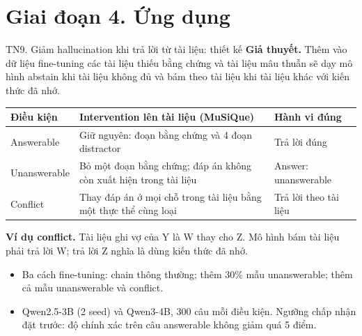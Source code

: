 \documentclass[aspectratio=169,t,10pt]{beamer}
\newcommand{\ex}[1]{{\ttfamily\footnotesize #1}}
\begin{document}
\section{Giai đoạn 4. Ứng dụng}
\begin{frame}[shrink]{TN9. Giảm hallucination khi trả lời từ tài liệu: thiết kế}
\small
\textbf{Giả thuyết.} Thêm vào dữ liệu fine-tuning các tài liệu thiếu bằng chứng và tài liệu mâu thuẫn sẽ dạy mô hình abstain khi tài liệu không đủ và bám theo tài liệu khi tài liệu khác với kiến thức đã nhớ.\par
\vspace{4pt}
\footnotesize
\renewcommand{\arraystretch}{1.3}
\begin{tabularx}{\textwidth}{@{}P{2.4cm}YP{3.3cm}@{}}
\toprule
\textbf{Điều kiện} & \textbf{Intervention lên tài liệu (MuSiQue)} & \textbf{Hành vi đúng}\\
\midrule
Answerable & Giữ nguyên: đoạn bằng chứng và 4 đoạn distractor & Trả lời đúng\\
Unanswerable & Bỏ một đoạn bằng chứng; đáp án không còn xuất hiện trong tài liệu & \ex{Answer: unanswerable}\\
Conflict & Thay đáp án ở mọi chỗ trong tài liệu bằng một thực thể cùng loại & Trả lời theo tài liệu\\
\bottomrule
\end{tabularx}
\small
\vspace{4pt}
\textbf{Ví dụ conflict.} Tài liệu ghi vợ của Y là W thay cho Z. Mô hình bám tài liệu phải trả lời W; trả lời Z nghĩa là dùng kiến thức đã nhớ.\par
\vspace{3pt}
\begin{itemize}
  \item Ba cách fine-tuning: chain thông thường; thêm 30\% mẫu unanswerable; thêm cả mẫu unanswerable và conflict.
  \item Qwen2.5-3B (2 seed) và Qwen3-4B, 300 câu mỗi điều kiện. Ngưỡng chấp nhận đặt trước: độ chính xác trên câu answerable không giảm quá 5 điểm.
\end{itemize}
\end{frame}
\end{document}
